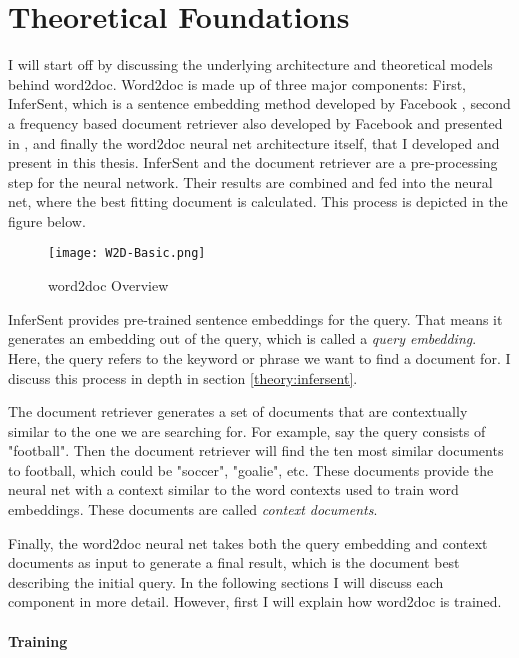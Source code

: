 \chapter{Theoretical Foundations}
\label{theory}

I will start off by discussing the underlying architecture and theoretical models behind word2doc. Word2doc is made up of three
major components: First, InferSent, which is a sentence embedding method developed by Facebook \citep{infersent}, second a frequency
based document retriever also developed by Facebook and presented in \citep{drqa}, and finally the word2doc neural net architecture
itself, that I developed and present in this thesis. InferSent and the document retriever are a pre-processing step for the neural
network. Their results are combined and fed into the neural net, where the best fitting document is calculated. This
process is depicted in the figure below.

\begin{figure}[H]
  \begin{center}
    \texttt{[image: W2D-Basic.png]}
  \end{center}
  \caption{word2doc Overview}
  \medskip
  \label{fig:w2db}
\end{figure}

InferSent provides pre-trained sentence embeddings for the query. That means it generates an embedding out of the query, which is
called a \textit{query embedding}. Here, the query refers to the keyword or phrase we want to find a document for. I discuss this
process in depth in section \ref{theory:infersent}.

The document retriever generates a set of documents that are contextually similar to the one we are searching for. For example, say the
query consists of "football". Then the document retriever will find the ten most similar documents to football, which could be "soccer",
"goalie", etc. These documents provide the neural net with a context similar to the word contexts used to train word embeddings.
These documents are called \textit{context documents}.

Finally, the word2doc neural net takes both the query embedding and context documents as input to generate a final result, which is
the document best describing the initial query. In the following sections I will discuss each component in more detail. However,
first I will explain how word2doc is trained.


\subsubsection{Training}
\label{theory:training}

